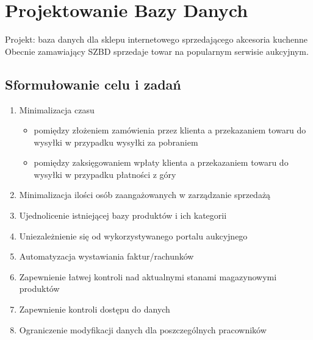\chapter{Projektowanie Bazy Danych}
Projekt: baza danych dla sklepu internetowego sprzedającego akcesoria kuchenne\\
Obecnie zamawiający SZBD sprzedaje towar na popularnym serwisie aukcyjnym.\\ 
\section{Sformułowanie celu i zadań}
\begin{enumerate}
\item Minimalizacja czasu
\begin{itemize}
\item pomiędzy złożeniem zamówienia przez klienta a przekazaniem towaru do wysyłki w przypadku wysyłki za pobraniem
\item pomiędzy zaksięgowaniem wpłaty klienta a przekazaniem towaru do wysyłki w przypadku płatności z góry 
\end{itemize} 
\item Minimalizacja ilości osób zaangażowanych w zarządzanie sprzedażą
\item Ujednolicenie istniejącej bazy produktów i ich kategorii
\item Uniezależnienie się od wykorzystywanego portalu aukcyjnego
\item Automatyzacja wystawiania faktur/rachunków
\item Zapewnienie łatwej kontroli nad aktualnymi stanami magazynowymi produktów
\item Zapewnienie kontroli dostępu do danych
\item Ograniczenie modyfikacji danych dla poszczególnych pracowników 
\end{enumerate}

